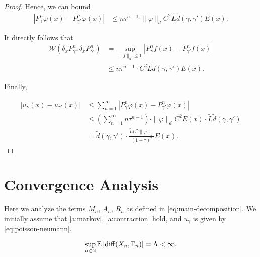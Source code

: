 \begin{lemma}
\begin{proof}
    Hence, we can bound
    \begin{align*}
        \left\vert P_{\gamma}^n\varphi(x)-P_{\gamma'}^n\varphi(x) \right\vert
        &\leq n\tau^{n-1} \cdot \| \varphi \|_d C^2 \tilde{L}  \tilde{d}(\gamma, \gamma') E(x).
    \end{align*}

    It directly follows that
    \begin{align*}
        \mathcal{W}(\delta_xP_{\gamma}^n, \delta_xP_{\gamma'}^n)
        &= \sup_{\| f \|_d \leq 1}  \left\vert P_{\gamma}^n f(x)-P_{\gamma'}^n f(x) \right\vert \\
        &\leq n\tau^{n-1} \cdot C^2 \tilde{L}  \tilde{d}(\gamma, \gamma') E(x).
    \end{align*}
    

    Finally,

    \begin{align*}
        \lvert u_\gamma(x) - u_{\gamma'}(x) \rvert 
        &\leq \sum_{n=1}^{\infty} \left\vert P_{\gamma}^n\varphi(x)-P_{\gamma'}^n\varphi(x) \right\vert \\
        &\leq \left( \sum_{n=1}^{\infty} n\tau^{n-1} \right) \cdot \| \varphi \|_d C^2E(x) \cdot \tilde{L}\tilde{d}(\gamma, \gamma') \\
        &= \tilde{d}(\gamma, \gamma') \cdot \frac{\tilde{L} C^2 \| \varphi \|_d}{(1-\tau)^2} E(x).
    \end{align*}
    
\end{proof}
\end{lemma}

\section{Convergence Analysis}

Here we analyze the terms $M_n$, $A_n$, $R_n$ as defined in \eqref{eq:main-decomposition}.
We initially assume that \ref{a:markov}, \ref{a:contraction} hold, and $u_\gamma$ is given by \eqref{eq:poisson-neumann}.



\begin{assumption}
\label{a:bounded-diffusison}
    \[
    \sup_{n \in \mathbb{N}} \mathbb{E} \left[ \mathrm{diff}(X_n, \Gamma_n) \right] = \Lambda < \infty.
    \]
\end{assumption}

